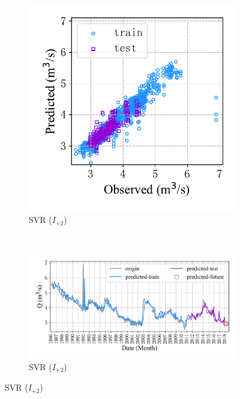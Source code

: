 \begin{figure}[!htbp]
\begin{subfigure}[b]{0.615\textwidth}
  \end{subfigure}
  \\
  \begin{subfigure}[b]{0.305\textwidth}
    \includegraphics[width=\textwidth]{Img/chap4_spr/out3/spr_scatter_in_2_out_3_svr.pdf}
    \vspace{-1.2cm}
    \caption{SVR ($I_{+2}$)}
    \label{fig:spr_scatter_in_2_out_3_svr}
  \end{subfigure}
  ~
  \begin{subfigure}[b]{0.615\textwidth}
    \includegraphics[width=\textwidth]{Img/chap4_spr/out3/spr_series_in_2_out_3_svr.pdf}
    \vspace{-1.2cm}
    \caption{SVR ($I_{+2}$)}
    \label{fig:spr_series_in_2_out_3_svr}

\end{subfigure}
\end{figure}
